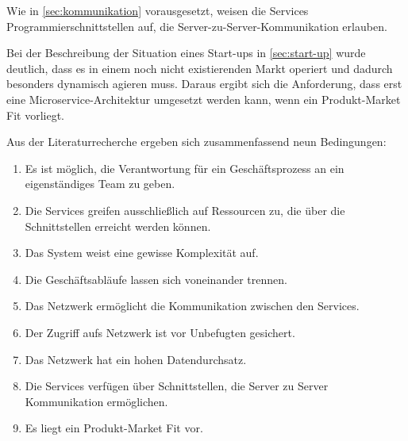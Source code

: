 Wie in \cref{sec:kommunikation} vorausgesetzt, weisen die Services Programmierschnittstellen auf, die Server-zu-Server-Kommunikation erlauben.

Bei der Beschreibung der Situation eines Start-ups in \cref{sec:start-up} wurde deutlich, dass es in einem noch nicht existierenden Markt operiert und dadurch besonders dynamisch agieren muss. Daraus ergibt sich die Anforderung, dass erst eine Microservice-Architektur umgesetzt werden kann, wenn ein Produkt-Market Fit vorliegt.

Aus der Literaturrecherche ergeben sich zusammenfassend neun Bedingungen:
\begin{enumerate}
	\item Es ist möglich, die Verantwortung für ein Geschäftsprozess an ein eigenständiges Team zu geben.
	\item Die Services greifen ausschließlich auf Ressourcen zu, die über die Schnittstellen erreicht werden können.
	\item Das System weist eine gewisse Komplexität auf.
	\item Die Geschäftsabläufe lassen sich voneinander trennen.
	\item Das Netzwerk ermöglicht die Kommunikation zwischen den Services.
	\item Der Zugriff aufs Netzwerk ist vor Unbefugten gesichert.
	\item Das Netzwerk hat ein hohen Datendurchsatz.
	\item Die Services verfügen über Schnittstellen, die Server zu Server Kommunikation ermöglichen.
	\item Es liegt ein Produkt-Market Fit vor.
\end{enumerate}